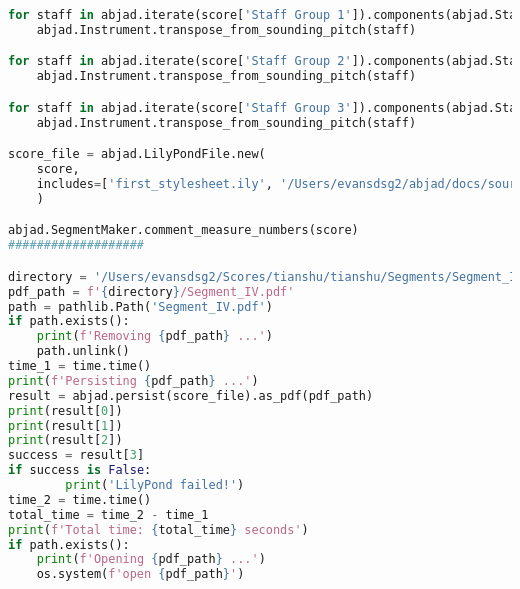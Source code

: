 \begin{lstlisting}[language=Python, caption=Tianshu Segment\_IV]
for staff in abjad.iterate(score['Staff Group 1']).components(abjad.Staff):
    abjad.Instrument.transpose_from_sounding_pitch(staff)

for staff in abjad.iterate(score['Staff Group 2']).components(abjad.Staff):
    abjad.Instrument.transpose_from_sounding_pitch(staff)

for staff in abjad.iterate(score['Staff Group 3']).components(abjad.Staff):
    abjad.Instrument.transpose_from_sounding_pitch(staff)

score_file = abjad.LilyPondFile.new(
    score,
    includes=['first_stylesheet.ily', '/Users/evansdsg2/abjad/docs/source/_stylesheets/abjad.ily'],
    )

abjad.SegmentMaker.comment_measure_numbers(score)
###################

directory = '/Users/evansdsg2/Scores/tianshu/tianshu/Segments/Segment_IV'
pdf_path = f'{directory}/Segment_IV.pdf'
path = pathlib.Path('Segment_IV.pdf')
if path.exists():
    print(f'Removing {pdf_path} ...')
    path.unlink()
time_1 = time.time()
print(f'Persisting {pdf_path} ...')
result = abjad.persist(score_file).as_pdf(pdf_path)
print(result[0])
print(result[1])
print(result[2])
success = result[3]
if success is False:
        print('LilyPond failed!')
time_2 = time.time()
total_time = time_2 - time_1
print(f'Total time: {total_time} seconds')
if path.exists():
    print(f'Opening {pdf_path} ...')
    os.system(f'open {pdf_path}')
\end{lstlisting}
\doublespace


